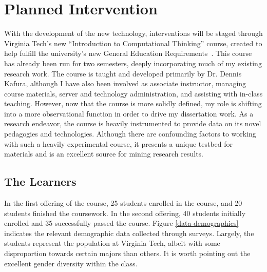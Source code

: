 \section{Planned Intervention}

With the development of the new technology, interventions will be staged through Virginia Tech's new ``Introduction to Computational Thinking'' course, created to help fulfill the university's new General Education Requirements~\cite{vt-vision}. 
This course has already been run for two semesters, deeply incorporating much of my existing research work.
The course is taught and developed primarily by Dr. Dennis Kafura, although I have also been involved as associate instructor, managing course materials, server and technology administration, and assisting with in-class teaching.
However, now that the course is more solidly defined, my role is shifting into a more observational function in order to drive my dissertation work.
As a research endeavor, the course is heavily instrumented to provide data on its novel pedagogies and technologies.
Although there are confounding factors to working with such a heavily experimental course, it presents a unique testbed for materials and is an excellent source for mining research results.

\subsection{The Learners}

In the first offering of the course, 25 students enrolled in the course, and 20 students finished the coursework.
In the second offering, 40 students initially enrolled and 35 successfully passed the course.
Figure \ref{data-demographics} indicates the relevant demographic data collected through surveys.
Largely, the students represent the population at Virginia Tech, albeit with some disproportion towards certain majors than others.
It is worth pointing out the excellent gender diversity within the class.

